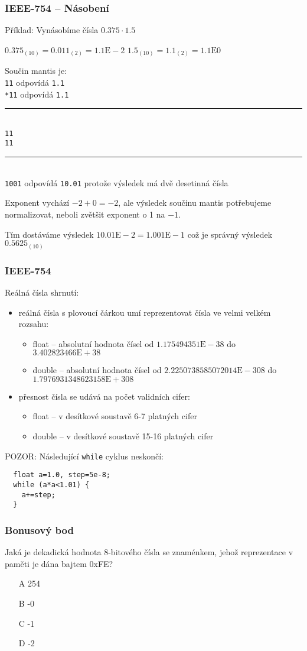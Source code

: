 \documentclass{beamer}
\begin{document}
\begin{frame}
\frametitle{IEEE-754 -- Násobení}

Příklad: Vynásobíme čísla $0.375 \cdot 1.5$

$0.375_{(10)} = 0.011_{(2)} = 1.1\text{E}-2$ \phantom{xxx} $1.5_{(10)} = 1.1_{(2)} = 1.1\text{E}0$

Součin mantis je:\\
\texttt{\phantom{xxx}11} odpovídá \texttt{1.1}\\
\texttt{\phantom{xx}*11} odpovídá \texttt{1.1}\vspace{-6pt}\\
\rule[0pt]{2cm}{0.4pt}\\
\texttt{\phantom{xxx}11}\\
\texttt{\phantom{xx}11}\vspace{-6pt}\\
\rule[0pt]{2cm}{0.4pt}\\
\texttt{\phantom{x}1001} odpovídá \texttt{10.01} protože výsledek má dvě desetinná čísla

Exponent vychází $-2+0=-2$, ale výsledek součinu mantis potřebujeme normalizovat, neboli zvětšit exponent o 1 na $-1$.

Tím dostáváme výsledek $10.01\text{E}-2 = 1.001\text{E}-1$ což je správný výsledek $0.5625_{(10)}$

\end{frame}

\begin{frame}[fragile]
\frametitle{IEEE-754}

Reálná čísla shrnutí:
\begin{itemize}
\item reálná čísla s plovoucí čárkou umí reprezentovat čísla ve velmi velkém rozsahu:
\begin{itemize}
\item float -- absolutní hodnota čísel od $1.175494351\text{E}-38$ do $3.402823466\text{E} + 38$
\item double -- absolutní hodnota čísel od $2.2250738585072014\text{E} - 308$ do $1.7976931348623158\text{E} + 308$
\end{itemize}
\item přesnost čísla se udává na počet validních cifer:
\begin{itemize}
\item float -- v desítkové soustavě 6-7 platných cifer
\item double -- v desítkové soustavě 15-16 platných cifer
\end{itemize}
\end{itemize}

POZOR: Následující \texttt{while} cyklus neskončí:
\begin{verbatim}
  float a=1.0, step=5e-8;
  while (a*a<1.01) {
    a+=step;
  }
\end{verbatim}
\end{frame}


\begin{frame}
\frametitle{Bonusový bod}

Jaká je dekadická hodnota 8-bitového čísla se znaménkem, jehož reprezentace v paměti je dána bajtem 0xFE?
\begin{itemize}
\item[A] 254
\item[B] -0
\item[C] -1
\item[D] -2
\end{itemize}

\end{frame}
\end{document}
